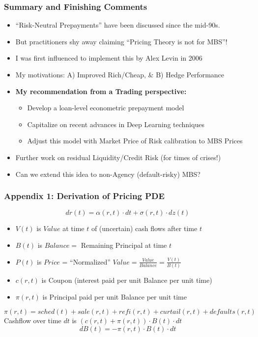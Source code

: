 \documentclass{beamer}
\begin{document}
\begin{frame}
\frametitle{Summary and Finishing Comments}
\begin{itemize}
\item ``Risk-Neutral Prepayments'' have been discussed since the mid-90s.
\item But practitioners shy away claiming ``Pricing Theory is not for MBS''!
\item I was first influenced to implement this by Alex Levin in 2006
\item My motivations: A) Improved Rich/Cheap, \& B) Hedge Performance
\item {\bf My recommendation from a Trading perspective:}
\begin{itemize}
\item Develop a loan-level econometric prepayment model
\item Capitalize on recent advances in Deep Learning techniques
\item Adjust this model with Market Price of Risk calibration to MBS Prices
\end{itemize}
\item Further work on residual Liquidity/Credit Risk (for times of crises!)
\item Can we extend this idea to non-Agency (default-risky) MBS?
\end{itemize}
\end{frame}

\begin{frame}
\frametitle{Appendix 1: Derivation of Pricing PDE}
$$ dr(t) = \alpha(r, t) \cdot dt + \sigma(r, t) \cdot dz(t)$$
\begin{itemize}
\item $V(t)$ is $Value$ at time $t$ of (uncertain) cash flows after time $t$
\item $B(t)$ is $Balance = $ Remaining Principal at time $t$
\item $P(t)$ is $Price$ = ``Normalized'' $Value = \frac {Value} {Balance} = \frac {V(t)} {B(t)}$
\item $c(r,t)$ is Coupon (interest paid per unit Balance per unit time)
\item $\pi(r,t)$ is Principal paid per unit Balance per unit time
\end{itemize}
$$\pi(r,t) = sched(t) + sale(r,t) + refi(r,t) + curtail(r,t) + defaults(r,t)$$
Cashflow over time $dt$ is $(c(r,t) + \pi(r,t)) \cdot B(t) \cdot dt$
$$dB(t) = - \pi(r,t) \cdot B(t) \cdot dt$$
\end{frame}
\end{document}
